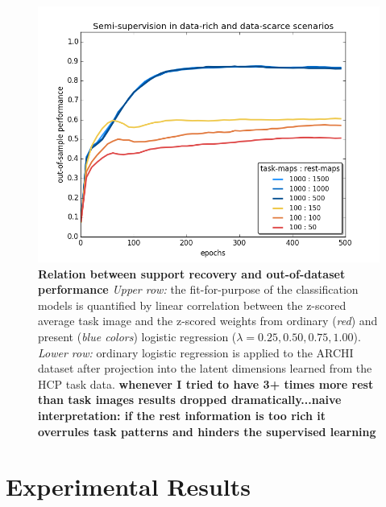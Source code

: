 \documentclass{article} %
\begin{document}
\begin{figure}
\begin{centering}
\includegraphics[width=1.00\textwidth]{figures/semisup.png}
\end{centering}
\caption{\textbf{Relation between support recovery and out-of-dataset performance}
\textit{Upper row:} the fit-for-purpose of the classification models
is quantified by linear correlation between the
z-scored average task image and the z-scored weights from
ordinary (\textit{red}) and present (\textit{blue colors}) logistic
regression ($\lambda=0.25, 0.50, 0.75, 1.00$).
\textit{Lower row:} ordinary logistic regression is applied to the
ARCHI dataset after projection into the latent dimensions learned from
the HCP task data.
\textbf{whenever I tried to have 3+ times more rest than task images results dropped dramatically...naive interpretation: if the rest information is too rich it overrules task patterns and hinders the supervised learning
}
}
\end{figure}

\section{Experimental Results}
\end{document}
